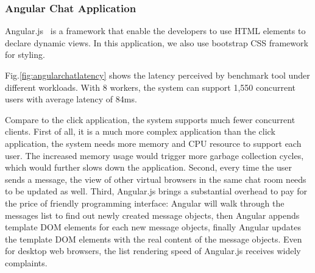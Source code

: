 







\subsubsection{Angular Chat Application}
\label{sec:angular}
Angular.js~\cite{angular} is a \js{} framework that enable the developers to
use HTML elements to declare dynamic views.
In this application, we also use bootstrap CSS framework for styling.

Fig.\ref{fig:angularchatlatency} shows the latency perceived by benchmark tool
under different workloads.
With 8 workers, the system can support 1,550 concurrent users with average latency
of 84ms.

Compare to the click application, the system supports much fewer concurrent clients.
First of all, it is a much more complex application than the click application,
the system needs more memory and CPU resource to support each user.
The increased memory usage would trigger more garbage collection cycles,
which would further slows down the application.
Second, every time the user sends a message, the view of other virtual browsers
in the same chat room needs to be updated as well.
Third, Angular.js brings a substantial overhead
to pay for the price of friendly programming interface: %
Angular will walk through the messages list to find out newly created
message objects,
then Angular appends template DOM elements for each new message objects,
finally Angular updates the template DOM elements with the real content of the
message objects.
Even for desktop web browsers, the list rendering speed of Angular.js
receives widely complaints.%

